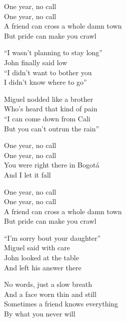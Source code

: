 \begin{lyrics}
One year, no call\\
One year, no call\\
A friend can cross a whole damn town\\
But pride can make you crawl

“I wasn’t planning to stay long”\\
John finally said low\\
“I didn’t want to bother you\\
I didn’t know where to go”

Miguel nodded like a brother\\
Who’s heard that kind of pain\\
“I can come down from Cali\\
But you can’t outrun the rain”

One year, no call\\
One year, no call\\
You were right there in Bogotá\\
And I let it fall

One year, no call\\
One year, no call\\
A friend can cross a whole damn town\\
But pride can make you crawl

“I’m sorry bout your daughter”\\
Miguel said with care\\
John looked at the table\\
And left his answer there

No words, just a slow breath\\
And a face worn thin and still\\
Sometimes a friend knows everything\\
By what you never will
\end{lyrics}

